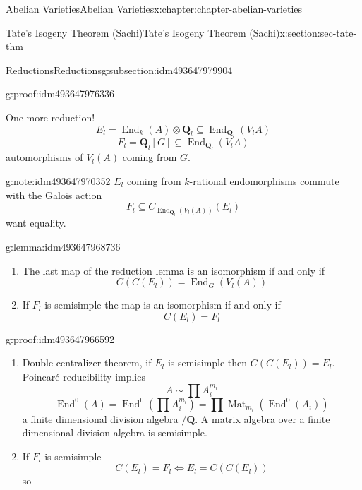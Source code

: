 \documentclass[oneside,10pt,]{book}
\numberwithin{equation}{section}
\newcommand{\QQ}{\mathbf{Q}}
\DeclareMathOperator{\End}{End}
\DeclareMathOperator{\Mat}{Mat}
\begin{document}
\begin{chapterptx}{Abelian Varieties}{}{Abelian Varieties}{}{}{x:chapter:chapter-abelian-varieties}
\begin{sectionptx}{Tate's Isogeny Theorem (Sachi)}{}{Tate's Isogeny Theorem (Sachi)}{}{}{x:section:sec-tate-thm}
\begin{subsectionptx}{Reductions}{}{Reductions}{}{}{g:subsection:idm493647979904}
\begin{proofptx}{}{g:proof:idm493647976336}
%
\end{proofptx}
One more reduction!%
\begin{equation*}
E_l = \End_k(A) \otimes \QQ_l\subseteq \End_{\QQ_l} (V_lA)
\end{equation*}
%
\begin{equation*}
F_l = \QQ_l[G] \subseteq \End_{\QQ_l} (V_lA)
\end{equation*}
automorphisms of \(V_l(A) \) coming from \(G\).%
\begin{note}{}{g:note:idm493647970352}%
\(E_l\) coming from \(k\)-rational endomorphisms commute with the Galois action%
\begin{equation*}
F_l\subseteq C_{\End_{\QQ_l}(V_l(A))}(E_l)
\end{equation*}
want equality.%
\end{note}
\begin{lemma}{}{}{g:lemma:idm493647968736}%
%
\begin{enumerate}
\item{}The last map of the reduction lemma is an isomorphism if and only if%
\begin{equation*}
C(C(E_l)) = \End_G(V_l(A))
\end{equation*}
%
\item{}If \(F_l\) is semisimple the map is an isomorphism if and only if%
\begin{equation*}
C(E_l) = F_l
\end{equation*}
%
\end{enumerate}
%
\end{lemma}
\begin{proofptx}{}{g:proof:idm493647966592}
%
\begin{enumerate}
\item{}Double centralizer theorem, if \(E_l\) is semisimple then \(C(C(E_l))= E_l\). Poincaré reducibility implies%
\begin{equation*}
A\sim \prod A_i^{m_i}
\end{equation*}
%
\begin{equation*}
\End^0(A) = \End^0(\prod A_i^{m_i}) = \prod \Mat_{m_i}(\End^0(A_i))
\end{equation*}
a finite dimensional division algebra \(/\QQ\). A matrix algebra over a finite dimensional division algebra is semisimple.%
\item{}If \(F_l\) is semisimple%
\begin{equation*}
C(E_l) = F_l \iff E_l = C(C(E_l))
\end{equation*}
so%
\begin{equation*}

\end{equation*}
\end{enumerate}
\end{proofptx}
\end{subsectionptx}
\end{sectionptx}
\end{chapterptx}
\end{document}
